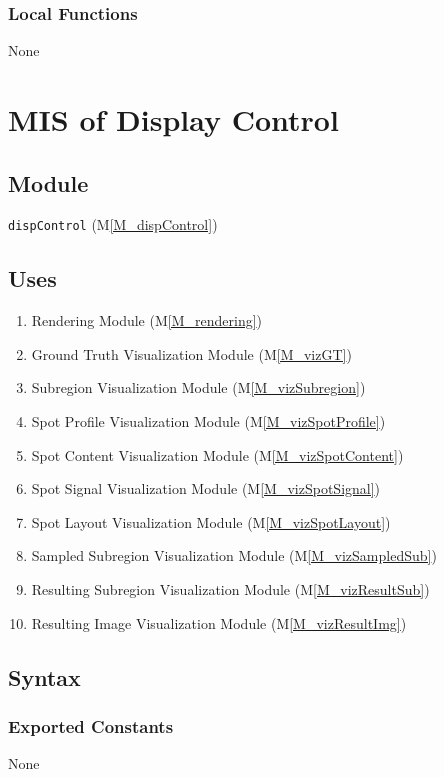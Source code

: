 \documentclass[12pt, titlepage]{article}
\newcommand{\mref}[1]{M\ref{#1}}
\newcommand{\mrefp}[1]{(\mref{#1})}
\newcommand{\mreff}[1]{Module \mrefp{#1}}
\newcommand{\code}[1]{\texttt{#1}}
\begin{document}
\subsubsection{Local Functions}
None

\newpage



\section{MIS of Display Control} \label{MS_dispControl}

\subsection{Module}
\code{dispControl} \mrefp{M_dispControl}

\subsection{Uses} \label{USES_dispControl}
\begin{enumerate}
  \item Rendering \mreff{M_rendering}
  \item Ground Truth Visualization \mreff{M_vizGT}
  \item Subregion Visualization \mreff{M_vizSubregion}
  \item Spot Profile Visualization \mreff{M_vizSpotProfile}
  \item Spot Content Visualization \mreff{M_vizSpotContent}
  \item Spot Signal Visualization \mreff{M_vizSpotSignal}
  \item Spot Layout Visualization \mreff{M_vizSpotLayout}
  \item Sampled Subregion Visualization \mreff{M_vizSampledSub}
  \item Resulting Subregion Visualization \mreff{M_vizResultSub}
  \item Resulting Image Visualization \mreff{M_vizResultImg}
\end{enumerate}

\subsection{Syntax}

\subsubsection{Exported Constants}
None
\end{document}
